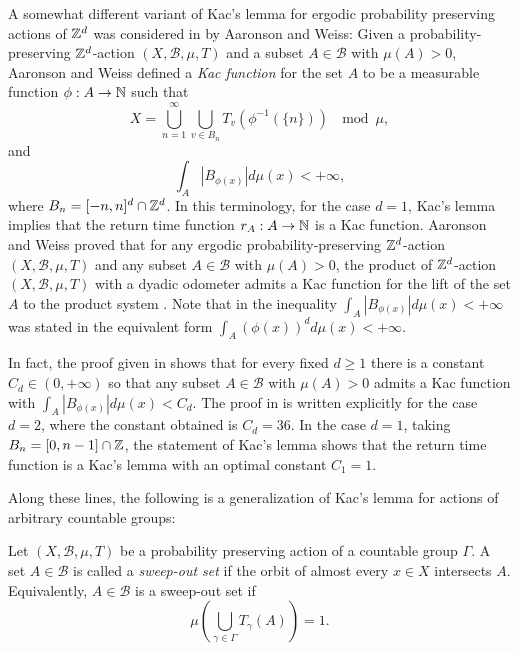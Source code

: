 \documentclass[12pt,reqno]{amsart}
\begin{document}
A somewhat different variant of  Kac's lemma for ergodic probability preserving actions of $\mathbb{Z}^d$ was considered  
in  \cite{MR1412593} by Aaronson and Weiss: Given a probability-preserving $\mathbb{Z}^d$-action $(X,\mathcal{B},\mu,T)$  %
and a subset $A \in \mathcal{B}$ with $\mu(A)>0$,
Aaronson and Weiss defined a \emph{Kac function} for the set $A$ to be a measurable function $\phi:A \to \mathbb{N}$ such that
\[   X = \bigcup_{n=1}^\infty \bigcup_{v \in B_n}T_v(\phi^{-1}(\{n\})) ~\mod \mu,
\]
and
\[
\int_A | B_{\phi(x)}| d\mu(x) < + \infty,
\]
where $B_n = [-n,n]^d \cap \mathbb{Z}^d$.
In this terminology, for the case $d=1$, Kac's lemma implies that the return time function $r_A:A \to \mathbb{N}$ is a Kac function. Aaronson and Weiss proved that for any ergodic  probability-preserving $\mathbb{Z}^d$-action $(X,\mathcal{B},\mu,T)$ and any  subset $A \in \mathcal{B}$ with $\mu(A)>0$, the product of $\mathbb{Z}^d$-action $(X,\mathcal{B},\mu,T)$ with a dyadic odometer admits a Kac function for the lift of the set $A$ to the product system \cite[Theorem 2.1]{MR1412593}.
Note that in \cite{MR1412593} the inequality $\int_A | B_{\phi(x)}| d\mu(x) < + \infty$ was stated in the equivalent form   $\int_A (\phi(x))^d d\mu(x) < +\infty$.

In fact, the proof given in \cite{MR1412593} shows that for every fixed $d \ge 1$ there is a constant $C_d \in (0,+\infty)$ so that any subset $A \in \mathcal{B}$ with $\mu(A)>0$ admits a Kac function with $\int_A | B_{\phi(x)}| d\mu(x) < C_d$. The proof in \cite{MR1412593} is written explicitly for the case $d=2$, where the constant obtained is $C_d=36$. In the case $d=1$, taking $B_n=[0,n-1] \cap \mathbb{Z}$, the statement of  Kac's lemma shows that the return time function is a Kac's lemma with an optimal constant  $C_1=1$. 


Along these lines, the following is a generalization of Kac's lemma for actions of arbitrary countable groups:


\begin{definition}\label{def:sweep_out}
   Let $(X,\mathcal{B},\mu,T)$ be a probability preserving action of a countable group $\Gamma$. A set $A\in \mathcal{B}$ is called a \emph{sweep-out set} if the orbit of almost every $x\in X$ intersects $A$. Equivalently, $A \in \mathcal{B}$ is a sweep-out set if 
   \[
   \mu\left(\bigcup_{\gamma \in \Gamma}T_{\gamma}(A)\right)=1.
   \]
\end{definition}
\end{document}
